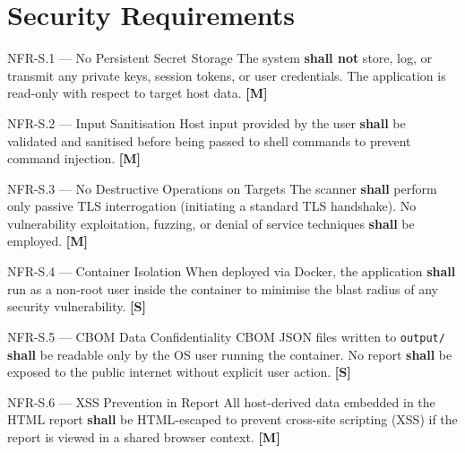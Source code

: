 \section{Security Requirements}
\label{sec:security}

\begin{reqbox}{NFR-S.1 — No Persistent Secret Storage}
  The system \textbf{shall not} store, log, or transmit any private keys,
  session tokens, or user credentials. The application is read-only with respect
  to target host data. \hfill \textbf{[M]}
\end{reqbox}

\begin{reqbox}{NFR-S.2 — Input Sanitisation}
  Host input provided by the user \textbf{shall} be validated and sanitised
  before being passed to shell commands to prevent command injection.
  \hfill \textbf{[M]}
\end{reqbox}

\begin{reqbox}{NFR-S.3 — No Destructive Operations on Targets}
  The scanner \textbf{shall} perform only passive TLS interrogation (initiating
  a standard TLS handshake). No vulnerability exploitation, fuzzing, or denial
  of service techniques \textbf{shall} be employed. \hfill \textbf{[M]}
\end{reqbox}

\begin{reqbox}{NFR-S.4 — Container Isolation}
  When deployed via Docker, the application \textbf{shall} run as a non-root
  user inside the container to minimise the blast radius of any security
  vulnerability. \hfill \textbf{[S]}
\end{reqbox}

\begin{reqbox}{NFR-S.5 — CBOM Data Confidentiality}
  CBOM JSON files written to \texttt{output/} \textbf{shall} be readable
  only by the OS user running the container. No report \textbf{shall} be
  exposed to the public internet without explicit user action. \hfill \textbf{[S]}
\end{reqbox}

\begin{reqbox}{NFR-S.6 — XSS Prevention in Report}
  All host-derived data embedded in the HTML report \textbf{shall} be HTML-escaped
  to prevent cross-site scripting (XSS) if the report is viewed in a shared
  browser context. \hfill \textbf{[M]}
\end{reqbox}

